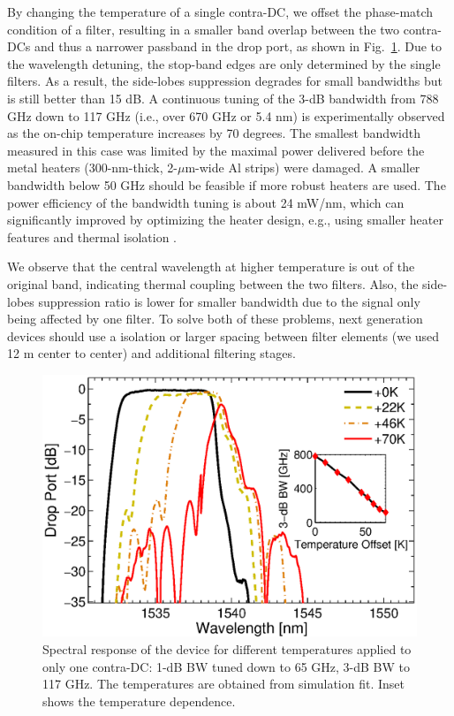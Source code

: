 \documentclass[osajnl,twocolumn,showpacs,superscriptaddress,10pt]{revtex4-1}
\begin{document}
By changing the temperature of a single contra-DC, we offset the phase-match condition of a filter, resulting in a smaller band overlap between the two contra-DCs and thus a narrower passband in the drop port, as shown in Fig.~\ref{fig:bandTune}.  
Due to the wavelength detuning,  the stop-band edges are only determined by the single filters. 
As a result, the side-lobes suppression degrades  for small bandwidths but is still better than 15 dB. A continuous tuning of the 3-dB bandwidth from 788 GHz down to 117 GHz (i.e., over 670 GHz or 5.4 nm) is experimentally observed as the on-chip temperature increases by 70 degrees. 
The smallest bandwidth measured in this case was limited by the maximal power delivered before the metal heaters (300-nm-thick, 2-$\mu$m-wide Al strips) were damaged. A smaller bandwidth below 50 GHz should be feasible if more robust heaters are used.
The power efficiency of the bandwidth tuning is about 24 mW/nm, which can significantly improved by optimizing the heater design, e.g., using smaller heater features and thermal isolation \cite{dong2010thermally}.

We observe that the central wavelength at higher temperature is out of the original band, indicating thermal coupling between the two filters. Also, the side-lobes suppression ratio is lower for smaller bandwidth due to the signal only being affected by one filter. To solve both of these problems, next generation devices should use a isolation or larger spacing between filter elements (we used 12 \text{$\mu$}m center to center) and additional filtering stages.

\begin{figure}[htbp]
\centering
\includegraphics[width=.99\columnwidth]{data/Band6}
\caption{Spectral response of the device for different temperatures applied to only one contra-DC: 1-dB BW tuned down to 65 GHz, 3-dB BW to 117 GHz. The temperatures are obtained from simulation fit. Inset shows the temperature dependence.}
\label{fig:bandTune}
\end{figure} 
\end{document}
